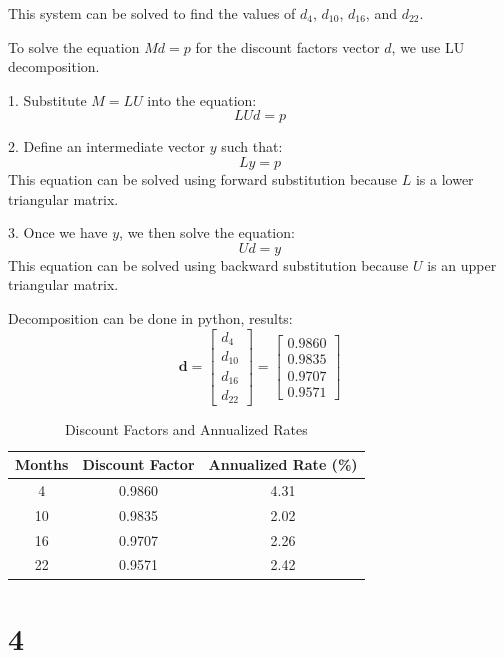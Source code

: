 \documentclass{article}
\begin{document}
This system can be solved to find the values of \( d_4 \), \( d_{10} \), \( d_{16} \), and \( d_{22} \).

To solve the equation \( M d = p \) for the discount factors vector \( d \), we use LU decomposition.

1. Substitute \( M = LU \) into the equation:
\[
    LU d = p
\]

2. Define an intermediate vector \( y \) such that:
\[
    L y = p
\]
This equation can be solved using forward substitution because \( L \) is a lower triangular matrix.

3. Once we have \( y \), we then solve the equation:
\[
    U d = y
\]
This equation can be solved using backward substitution because \( U \) is an upper triangular matrix.

Decomposition can be done in python, results:
\[
    \mathbf{d} = \begin{bmatrix}
        d_4    \\
        d_{10} \\
        d_{16} \\
        d_{22}
    \end{bmatrix} = \begin{bmatrix}
        0.9860 \\
        0.9835 \\
        0.9707 \\
        0.9571
    \end{bmatrix}
\]
\begin{table}[h]
    \centering
    \begin{tabular}{|c|c|c|}
        \hline
        \textbf{Months} & \textbf{Discount Factor} & \textbf{Annualized Rate (\%)} \\
        \hline
        4               & 0.9860                   & 4.31                          \\
        10              & 0.9835                   & 2.02                          \\
        16              & 0.9707                   & 2.26                          \\
        22              & 0.9571                   & 2.42                          \\
        \hline
    \end{tabular}
    \caption{Discount Factors and Annualized Rates}
    \label{tab:discount_rates}
\end{table}


\section*{4}
\end{document}
